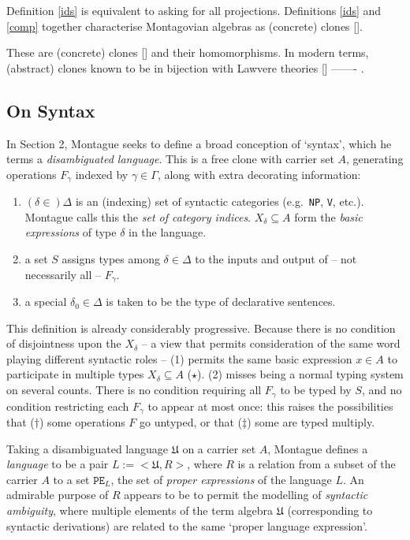 Definition \ref{ids} is equivalent to asking for all projections. Definitions \ref{ids} and \ref{comp} together characterise Montagovian algebras as (concrete) clones []. 


These are (concrete) clones [] and their homomorphisms. In modern terms, (abstract) clones known to be in bijection with Lawvere theories [] ------- . 

\subsection{On Syntax}

In Section 2, Montague seeks to define a broad conception of `syntax', which he terms a \emph{disambiguated language}. This is a free clone with carrier set $A$, generating operations $F_\gamma$ indexed by $\gamma \in \Gamma$, along with extra decorating information:

\begin{enumerate}
\item{$(\delta \in) \Delta$ is an (indexing) set of syntactic categories (e.g.~\texttt{NP}, \texttt{V}, etc.). Montague calls this the \emph{set of category indices}. $X_\delta \subseteq A$ form the \emph{basic expressions} of type $\delta$ in the language.}
\item{a set $S$ assigns types among $\delta \in \Delta$ to the inputs and output of -- not necessarily all -- $F_\gamma$.}
\item{a special $\delta_0 \in \Delta$ is taken to be the type of declarative sentences.}
\end{enumerate}

This definition is already considerably progressive. Because there is no condition of disjointness upon the $X_\delta$ -- a view that permits consideration of the same word playing different syntactic roles -- (1) permits the same basic expression $x \in A$ to participate in multiple types $X_\delta \subseteq A$ ($\star$). (2) misses being a normal typing system on several counts. There is no condition requiring all $F_\gamma$ to be typed by $S$, and no condition restricting each $F_\gamma$ to appear at most once: this raises the possibilities that ($\dag$) some operations $F$ go untyped, or that ($\ddag$) some are typed multiply.

Taking a disambiguated language $\mathfrak{U}$ on a carrier set $A$, Montague defines a \emph{language} to be a pair $L := <\mathfrak{U}, R>$, where $R$ is a relation from a subset of the carrier $A$ to a set $\texttt{PE}_L$, the set of \emph{proper expressions} of the language $L$. An admirable purpose of $R$ appears to be to permit the modelling of \emph{syntactic ambiguity}, where multiple elements of the term algebra $\mathfrak{U}$ (corresponding to syntactic derivations) are related to the same `proper language expression'.

